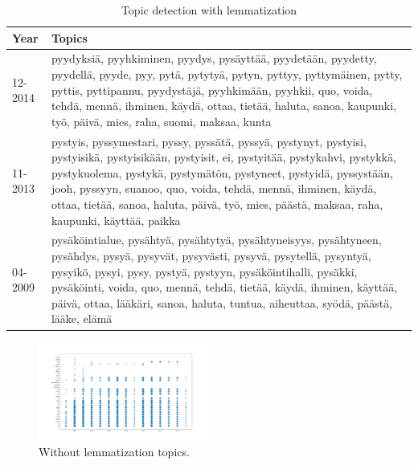 \documentclass[conference]{IEEEtran}
\begin{document}
\begin{table}[htbp]
    \caption{Topic detection with lemmatization}
    \begin{center}
        \begin{tabularx}{\linewidth}{| l | X |}
            \hline
            Year & Topics \\
            \hline
            12-2014 & pyydyksiä, pyyhkiminen, pyydys, pysäyttää, pyydetään, pyydetty, pyydellä, pyyde, pyy, pytä, pytytyä, pytyn, pyttyy, pyttymäinen, pytty, pyttis, pyttipannu, pyydystäjä, pyyhkimään, pyyhkii, quo, voida, tehdä, mennä, ihminen, käydä, ottaa, tietää, haluta, sanoa, kaupunki, työ, päivä, mies, raha, suomi, maksaa, kunta\\
            \hline
            11-2013 & pystyis, pyssymestari, pyssy, pyssätä, pyssyä, pystynyt, pystyisi, pystyisikä, pystyisikään, pystyisit, ei, pystyitää, pystykahvi, pystykkä, pystykuolema, pystykä, pystymätön, pystyneet, pystyidä, pyssystään, jooh, pyssyyn, suanoo, quo, voida, tehdä, mennä, ihminen, käydä, ottaa, tietää, sanoa, haluta, päivä, työ, mies, päästä, maksaa, raha, kaupunki, käyttää, paikka\\
            \hline
            04-2009 & pysäköintialue, pysähtyä, pysähtytyä, pysähtyneisyys, pysähtyneen, pysähdys, pysyä, pysyvät, pysyvästi, pysyvä, pysytellä, pysyntyä, pysyikö, pysyi, pysy, pystyä, pystyyn, pysäköintihalli, pysäkki, pysäköinti, voida, quo, mennä, tehdä, tietää, käydä, ihminen, käyttää, päivä, ottaa, lääkäri, sanoa, haluta, tuntua, aiheuttaa, syödä, päästä, lääke, elämä\\
            \hline
        \end{tabularx}
        \label{topic_detection_with_lemmatization}
    \end{center}
\end{table}

\begin{figure}[htbp]
    \centerline{\includegraphics[width=0.5\textwidth]{figures/fig15.png}}
    \caption{Without lemmatization topics.}
    \label{without_lemmatization_topics}
\end{figure}
\end{document}
